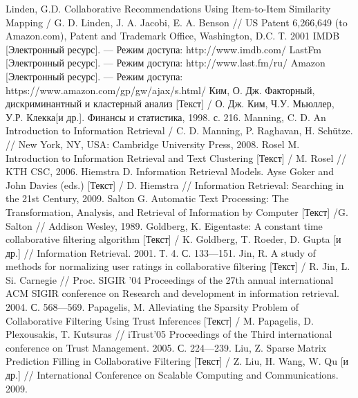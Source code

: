 \begin{thebibliography}{119}
 Linden, G.D. Collaborative Recommendations Using
Item-to-Item Similarity Mapping / G. D. Linden, J. A. Jacobi, E. A. Benson
// US Patent 6,266,649 (to Amazon.com), Patent
and Trademark Office, Washington, D.C. Т. 2001
 IMDB [Электронный ресурс]. --- Режим доступа: http://www.imdb.com/
 LastFm [Электронный ресурс]. --- Режим доступа: http://www.last.fm/ru/
 Amazon [Электронный ресурс]. --- Режим доступа: https://www.amazon.com/gp/gw/ajax/s.html/
 Ким, О. Дж. Факторный, дискриминантный и кластерный анализ [Текст] / О. Дж. Ким,
 Ч.У. Мьюллер,  У.Р. Клекка[и др.]. Финансы и статистика, 1998. с. 216.
 Manning, C. D. An Introduction to Information Retrieval / C. D. Manning, P. Raghavan, H. Schütze. // New York, NY, USA: Cambridge University Press, 2008.
 Rosel M. Introduction to Information Retrieval and Text Clustering [Текст] / M. Rosel // KTH CSC,
2006.
 Hiemstra D. Information Retrieval Models. Ayse Goker and John Davies (eds.) [Текст]  / D. Hiemstra //
Information Retrieval: Searching in the 21st Century, 2009.
 Salton G. Automatic Text Processing: The Transformation, Analysis, and
Retrieval of Information by Computer [Текст]  /G. Salton // Addison Wesley, 1989.
 Goldberg, K. Eigentaste: A constant time collaborative filtering algorithm [Текст]  / K. Goldberg,
T. Roeder, D. Gupta [и др.] // Information Retrieval. 2001. Т. 4. С. 133---151.
 Jin, R. A study of methods for normalizing user ratings
in collaborative filtering [Текст]  / R. Jin, L. Si. Carnegie // Proc. SIGIR ’04 Proceedings of the 27th annual
international ACM SIGIR conference on Research and development in
information retrieval. 2004. С. 568---569.
 Papagelis, M. Alleviating the Sparsity Problem of
Collaborative Filtering Using Trust Inferences [Текст]  / M. Papagelis, D. Plexousakis, T. Kutsuras
// iTrust’05 Proceedings of the
Third international conference on Trust Management. 2005. С. 224---239.
 Liu, Z. Sparse Matrix Prediction Filling in Collaborative Filtering [Текст] / Z. Liu, H. Wang,
W. Qu [и др.] // International Conference on Scalable Computing and
Communications. 2009.


\end{thebibliography}
